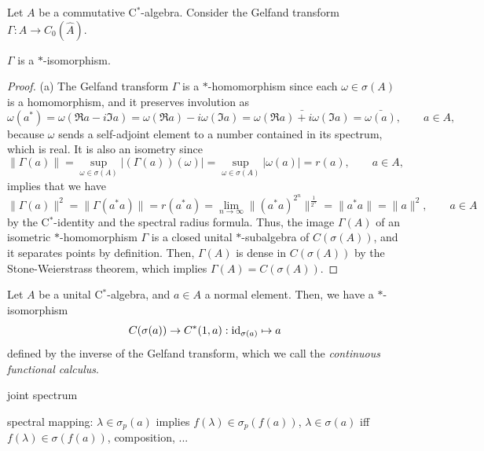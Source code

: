 \documentclass{../../large}
\begin{document}
\begin{prb}
Let $A$ be a commutative C$^*$-algebra.
Consider the Gelfand transform $\Gamma:A\to C_0(\hat A)$.
\begin{parts}
\item $\Gamma$ is a $*$-isomorphism.
\end{parts}
\end{prb}
\begin{proof}

(a)
The Gelfand transform $\Gamma$ is a $*$-homomorphism since each $\omega\in\sigma(A)$ is a homomorphism, and it preserves involution as
\[\omega(a^*)=\omega(\Re a-i\Im a)=\omega(\Re a)-i\omega(\Im a)=\bar{\omega(\Re a)+i\omega(\Im a)}=\bar{\omega(a)},\qquad a\in A,\]
because $\omega$ sends a self-adjoint element to a number contained in its spectrum, which is real.
It is also an isometry since 
\[\|\Gamma(a)\|=\sup_{\omega\in\sigma(A)}|(\Gamma(a))(\omega)|=\sup_{\omega\in\sigma(A)}|\omega(a)|=r(a),\qquad a\in A,\]
implies that we have
\[\|\Gamma(a)\|^2=\|\Gamma(a^*a)\|=r(a^*a)=\lim_{n\to\infty}\|(a^*a)^{2^n}\|^{\frac1{2^n}}=\|a^*a\|=\|a\|^2,\qquad a\in A\]
by the C$^*$-identity and the spectral radius formula.
Thus, the image $\Gamma(A)$ of an isometric $*$-homomorphism $\Gamma$ is a closed unital $*$-subalgebra of $C(\sigma(A))$, and it separates points by definition.
Then, $\Gamma(A)$ is dense in $C(\sigma(A))$ by the Stone-Weierstrass theorem, which implies $\Gamma(A)=C(\sigma(A))$.
\end{proof}

\begin{prb}
Let $A$ be a unital C$^*$-algebra, and $a\in A$ a normal element.
Then, we have a $*$-isomorphism
\[C(\sigma(a))\to C^*(1,a):\operatorname{id}_{\sigma(a)}\mapsto a\]
defined by the inverse of the Gelfand transform, which we call the \emph{continuous functional calculus}.

joint spectrum

\begin{parts}
\item spectral mapping: $\lambda\in\sigma_p(a)$ implies $f(\lambda)\in\sigma_p(f(a))$, $\lambda\in\sigma(a)$ iff $f(\lambda)\in\sigma(f(a))$, composition, ...
\end{parts}
\end{prb}
\end{document}
